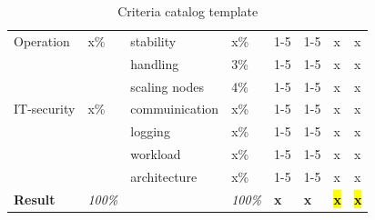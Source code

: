 \documentclass[MSC,Master,english]{twbook}%
\begin{document}
\begin{table}[ht]
\begin{center}
{\begin{tabular}{|l|l|l|l|l|l|l|l|}
            \hline
            Operation & x\% & stability & x\% & 1-5 & 1-5 & x & x \\
            & & handling & 3\% & 1-5 & 1-5 & x & x \\
            & & scaling nodes & 4\% & 1-5 & 1-5 & x & x \\
            \hline
            IT-security & x\% & commuinication & x\% & 1-5 & 1-5 & x & x \\
            & & logging & x\% & 1-5 & 1-5 & x & x  \\
            & & workload & x\% & 1-5 & 1-5 & x & x \\
            & & architecture & x\% & 1-5 & 1-5 & x & x \\
            \hline \hline
            \textbf{Result} & \textit{100\%} & & \textit{100\%} & \textbf{x} & \textbf{x} & \hl{\textbf{x}} & \hl{\textbf{x}} \\
            \hline
        \end{tabular}}
        \caption{Criteria catalog template}
        \label{tab:cctt}
    \end{center}
\end{table}
\end{document}
